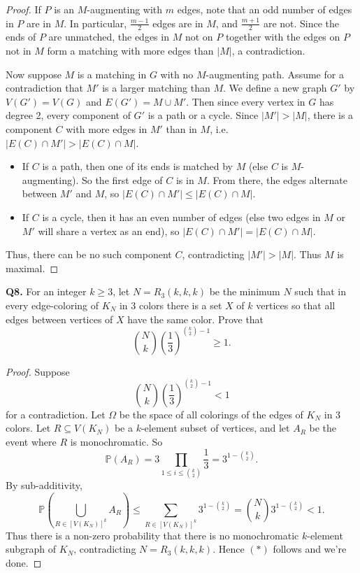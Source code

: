 \documentclass{article}
\begin{document}
\begin{proof}
If \( P \) is an \( M \)-augmenting with \( m \) edges, note that an odd number of edges in \( P \) are in \( M \). In particular, \( \frac{m-1}{2}  \)  edges are in \( M \), and \( \frac{m+1}{2}  \) are not. Since the ends of \( P \) are unmatched, the edges in \( M \) not on \( P \) together with the edges on \( P \) not in \( M \) form a matching with more edges than \( |M| \), a contradiction.

Now suppose \( M \) is a matching in \( G \) with no \( M \)-augmenting path. Assume for a contradiction that \( M' \) is a larger matching than \( M \). We define a new graph \( G' \) by \( V(G') = V(G) \) and \( E(G') = M \cup M' \). Then since every vertex in \( G \) has degree 2, every component of \( G' \) is a path or a cycle. Since \( |M'| > |M| \), there is a component \( C \) with more edges in \( M' \) than in \( M \), i.e. \( |E(C) \cap M'| > |E(C) \cap M| \).
\begin{itemize}[nolistsep]
	\item If \( C \) is a path, then one of its ends is matched by \( M \) (else \( C \) is \( M \)-augmenting). So the first edge of \( C \) is in \( M \). From there, the edges alternate between \( M' \) and \( M \), so \( |E(C) \cap M'| \leq |E(C) \cap M| \).
	\item If \( C \) is a cycle, then it has an even number of edges (else two edges in \( M \) or \( M' \) will share a vertex as an end), so \( |E(C) \cap M'| = |E(C) \cap M| \).
\end{itemize}
Thus, there can be no such component \( C \), contradicting \( |M'| > |M| \). Thus \( M \) is maximal.
\end{proof}
\noindent \textbf{Q8.} For an integer \( k \geq 3 \), let \( N = R_{3}(k,k,k)  \) be the minimum \( N \) such that in every edge-coloring of \( K_{N}  \) in 3 colors there is a set \( X \) of \( k \) vertices so that all edges between vertices of \( X \) have the same color. Prove that \[ \binom{N}{k} \left ( \frac{1}{3}  \right ) ^{\binom{k}{2} - 1} \geq 1 \tag{$\ast$}. \]
\begin{proof}
	Suppose \[  \binom{N}{k} \left ( \frac{1}{3}  \right ) ^{\binom{k}{2} - 1} < 1 \] for a contradiction. Let \( \Omega \) be the space of all colorings of the edges of \( K_{N}  \) in 3 colors. Let \( R \subseteq V(K_{N} ) \) be a \( k \)-element subset of vertices, and let \( A_R \) be the event where \( R \) is monochromatic. So \[ \mathbb{P}(A_{R}) = 3 \prod_{1 \leq i \leq \binom{k}{2} }^{} \frac{1}{3}  =  3^{1-\binom{k}{2} }. \] By sub-additivity, \[ \mathbb{P}\left ( \bigcup_{R \in [V(K_{N})]^{k} }^{} A_{R}  \right ) \leq \sum_{R \in [V(K_{N})]^{k}}^{} 3^{1-\binom{k}{2}} = \binom{N}{k} 3^{1 - \binom{k}{2} } < 1.  \] Thus there is a non-zero probability that there is no monochromatic \( k \)-element subgraph of \( K_{N}  \), contradicting \( N = R_{3} (k,k,k) \). Hence \((\ast)\) follows and we're done.
\end{proof}
\end{document}
